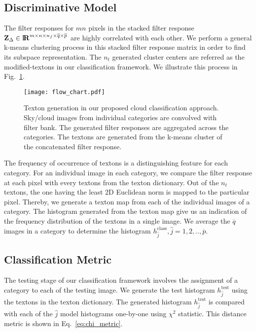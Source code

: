 \subsection{Discriminative Model}
The filter responses for $mn$ pixels in the stacked filter response $\mathbf{Z}_{\Delta} \in {\rm I\!\mathbf{R}}^{m \times n \times {n_f} \times \overline{q} \times \overline{p}}$ are highly correlated with each other. We perform a general k-means clustering process in this stacked filter response matrix in order to find its subspace representation. The $n_t$ generated cluster centers are referred as the modified-textons in our classification framework. We illustrate this process in Fig.~\ref{fig:frmwrk}.

\begin{figure}[htbp]
\centering
\texttt{[image: flow\_chart.pdf]}
\caption[Proposed texton-based framework for cloud type recognition.]{Texton generation in our proposed cloud classification approach. Sky/cloud images from individual categories are convolved with filter bank. The generated filter responses are aggregated across the categories. The textons are generated from the k-means cluster of the concatenated filter response.}
\label{fig:frmwrk}
\end{figure}

The frequency of occurrence of textons is a distinguishing feature for each category. For an individual image in each category, we compare the filter response at each pixel with every textons from the texton dictionary. Out of the $n_t$ textons, the one having the least $2$D Euclidean norm is mapped to the particular pixel. Thereby, we generate a texton map from each of the individual images of a category. The histogram generated from the texton map give us an indication of the frequency distribution of the textons in a single image. We average the $\overline{q}$ images in a category to determine the histogram $h_{\hat{j}}^{\mbox{class}}, \hat{j}=1,2,..,\overline{p}$.

\subsection{Classification Metric}
The testing stage of our classification framework involves the assignment of a category to each of the testing image. We generate the test histogram $h_{\hat{j}}^{\mbox{test}}$ using the textons in the texton dictionary. The generated histogram $h_{\hat{j}}^{\mbox{test}}$ is compared with each of the $\hat{j}$ model histograms one-by-one using $\chi^2$ statistic. This distance metric is shown in Eq.~\ref{eq:chi_metric}.

